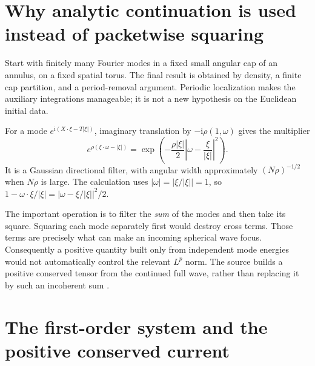 \documentclass[11pt,a4paper]{article}
\numberwithin{equation}{section}
\theoremstyle{definition}
\theoremstyle{remark}
\begin{document}
\section{Why analytic continuation is used instead of packetwise squaring}
\label{sec:filter}
Start with finitely many Fourier modes in a fixed small angular cap of an
annulus, on a fixed spatial torus. The final result is obtained by density,
a finite cap partition, and a period-removal argument. Periodic localization
makes the auxiliary integrations manageable; it is not a new hypothesis on
the Euclidean initial data.

For a mode $e^{\mathrm i(X\cdot\xi-T|\xi|)}$, imaginary translation by
$-\mathrm i\rho(1,\omega)$ gives the multiplier
\begin{equation}\label{eq:lightfilter}
 e^{\rho(\xi\cdot\omega-|\xi|)}
 =\exp\left(-\frac{\rho|\xi|}{2}
                \left|\omega-\frac\xi{|\xi|}\right|^2\right).
\end{equation}
It is a Gaussian directional filter, with angular width approximately
$(N\rho)^{-1/2}$ when $N\rho$ is large. The calculation uses
$|\omega|=|\xi/|\xi||=1$, so
$1-\omega\cdot\xi/|\xi|=|\omega-\xi/|\xi||^2/2$.

The important operation is to filter the \emph{sum} of the modes and then take
its square. Squaring each mode separately first would destroy cross terms.
Those terms are precisely what can make an incoming spherical wave focus.
Consequently a positive quantity built only from independent mode energies
would not automatically control the relevant $L^p$ norm. The source builds a
positive conserved tensor from the continued full wave, rather than replacing
it by such an incoherent sum \cite{current}.

\section{The first-order system and the positive conserved current}
\label{sec:current}
\end{document}
